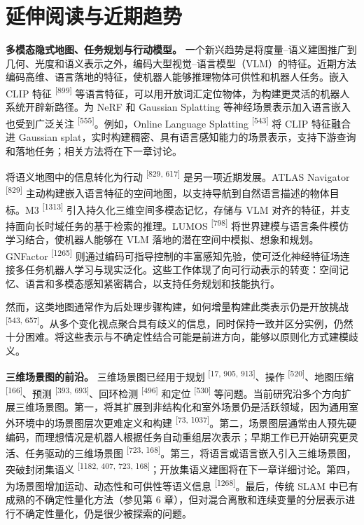 \section{延伸阅读与近期趋势}

\textbf{多模态隐式地图、任务规划与行动模型。} 一个新兴趋势是将度量--语义建图推广到几何、光度和语义表示之外，编码大型视觉--语言模型（VLM）的特征。近期方法编码高维、语言落地的特征，使机器人能够推理物体可供性和机器人任务。嵌入 CLIP 特征 \textsuperscript{[899]} 等语言特征，可以用开放词汇定位物体，为构建更灵活的机器人系统开辟新路径。为 NeRF 和 Gaussian Splatting 等神经场景表示加入语言嵌入也受到广泛关注 \textsuperscript{[555]}。例如，Online Language Splatting \textsuperscript{[543]} 将 CLIP 特征融合进 Gaussian splat，实时构建稠密、具有语言感知能力的场景表示，支持下游查询和落地任务；相关方法将在下一章讨论。

将语义地图中的信息转化为行动 \textsuperscript{[829, 617]} 是另一项近期发展。ATLAS Navigator \textsuperscript{[829]} 主动构建嵌入语言特征的空间地图，以支持导航到自然语言描述的物体目标。M3 \textsuperscript{[1313]} 引入持久化三维空间多模态记忆，存储与 VLM 对齐的特征，并支持面向长时域任务的基于检索的推理。LUMOS \textsuperscript{[798]} 将世界建模与语言条件模仿学习结合，使机器人能够在 VLM 落地的潜在空间中模拟、想象和规划。GNFactor \textsuperscript{[1265]} 则通过编码可指导控制的丰富感知先验，使可泛化神经特征场连接多任务机器人学习与现实泛化。这些工作体现了向可行动表示的转变：空间记忆、语言和多模态感知紧密耦合，以支持任务规划和技能执行。

然而，这类地图通常作为后处理步骤构建，如何增量构建此类表示仍是开放挑战 \textsuperscript{[543, 657]}。从多个变化视点聚合具有歧义的信息，同时保持一致并区分实例，仍然十分困难。将这些表示与不确定性结合可能是前进方向，能够以原则化方式建模歧义。

\textbf{三维场景图的前沿。} 三维场景图已经用于规划 \textsuperscript{[17, 905, 913]}、操作 \textsuperscript{[520]}、地图压缩 \textsuperscript{[166]}、预测 \textsuperscript{[393, 693]}、回环检测 \textsuperscript{[496]} 和定位 \textsuperscript{[530]} 等问题。当前研究沿多个方向扩展三维场景图。第一，将其扩展到非结构化和室外场景仍是活跃领域，因为通用室外环境中的场景图层次更难定义和构建 \textsuperscript{[73, 1037]}。第二，场景图层通常由人预先硬编码，而理想情况是机器人根据任务自动重组层次表示；早期工作已开始研究更灵活、任务驱动的三维场景图 \textsuperscript{[723, 168]}。第三，将语言或语言嵌入引入三维场景图，突破封闭集语义 \textsuperscript{[1182, 407, 723, 168]}；开放集语义建图将在下一章详细讨论。第四，为场景图增加运动、动态性和可供性等语义信息 \textsuperscript{[1268]}。最后，传统 SLAM 中已有成熟的不确定性量化方法（参见第 6 章），但对混合离散和连续变量的分层表示进行不确定性量化，仍是很少被探索的问题。

